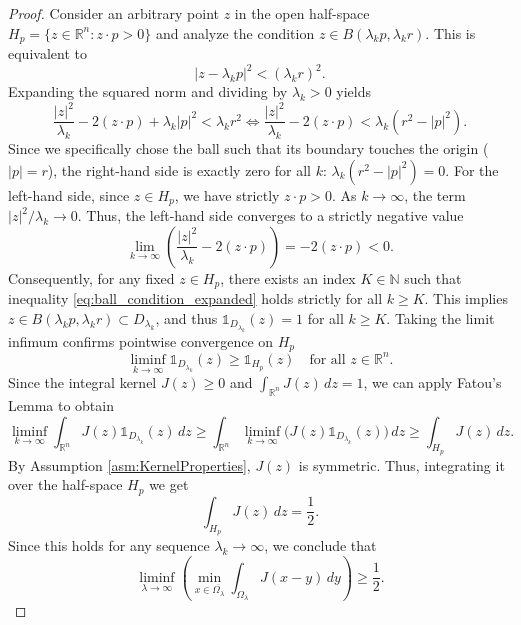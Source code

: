 \documentclass[12pt, a4paper]{article}
\theoremstyle{break}
\theoremstyle{break}
\theoremstyle{break}
\theoremstyle{break}
\theoremstyle{break}
\theoremstyle{break}
\theoremstyle{break}
\theoremstyle{break}
\theoremstyle{break}
\begin{document}
\begin{proof}
Consider an arbitrary point $z$ in the open half-space $H_p = \{ z \in \mathbb{R}^n : z \cdot p > 0 \}$ and analyze the condition $z \in B(\lambda_k p, \lambda_k r)$. This is equivalent to
\begin{equation} \label{eq:ball_condition}
    |z - \lambda_k p|^2 < (\lambda_k r)^2.
\end{equation}
Expanding the squared norm and dividing by $\lambda_k > 0$ yields
\begin{equation} \label{eq:ball_condition_expanded}
    \frac{|z|^2}{\lambda_k} - 2(z \cdot p) + \lambda_k |p|^2 < \lambda_k r^2 \iff \frac{|z|^2}{\lambda_k} - 2(z \cdot p) < \lambda_k (r^2 - |p|^2).
\end{equation}
Since we specifically chose the ball such that its boundary touches the origin ($|p| = r$), the right-hand side is exactly zero for all $k$: $\lambda_k (r^2 - |p|^2) = 0$. For the left-hand side, since $z \in H_p$, we have strictly $z \cdot p > 0$. As $k \to \infty$, the term $|z|^2 / \lambda_k \to 0$. Thus, the left-hand side converges to a strictly negative value
\begin{equation}
    \lim_{k \to \infty} \left( \frac{|z|^2}{\lambda_k} - 2(z \cdot p) \right) = -2(z \cdot p) < 0.
\end{equation}
Consequently, for any fixed $z \in H_p$, there exists an index $K \in \mathbb{N}$ such that inequality \eqref{eq:ball_condition_expanded} holds strictly for all $k \geq K$. This implies $z \in B(\lambda_k p, \lambda_k r) \subset D_{\lambda_k}$, and thus $\mathds{1}_{D_{\lambda_k}}(z) = 1$ for all $k \geq K$. Taking the limit infimum confirms pointwise convergence on $H_p$
\begin{equation}
    \liminf_{k \to \infty} \mathds{1}_{D_{\lambda_k}}(z) \geq \mathds{1}_{H_p}(z) \quad \text{for all } z \in \mathbb{R}^n.
\end{equation}
Since the integral kernel $J(z) \geq 0$ and $\int_{\mathbb{R}^n} J(z) \, dz = 1$, we can apply Fatou's Lemma to obtain
\begin{equation}
    \liminf_{k \to \infty} \int_{\mathbb{R}^n} J(z) \mathds{1}_{D_{\lambda_k}}(z) \, dz \geq \int_{\mathbb{R}^n} \liminf_{k \to \infty} \big( J(z) \mathds{1}_{D_{\lambda_k}}(z) \big) \, dz \geq \int_{H_p} J(z) \, dz.
\end{equation}
By Assumption \ref{asm:KernelProperties}, $J(z)$ is symmetric. Thus, integrating it over the half-space $H_p$ we get
\begin{equation}
    \int_{H_p} J(z) \, dz = \frac{1}{2}.
\end{equation}
Since this holds for any sequence $\lambda_k \to \infty$, we conclude that
\begin{equation}
    \liminf_{\lambda \to \infty} \left( \min_{x \in \overline{\Omega_\lambda}} \int_{\Omega_\lambda} J(x-y) \, dy \right) \geq \frac{1}{2}.
\end{equation}
\end{proof}
\end{document}
